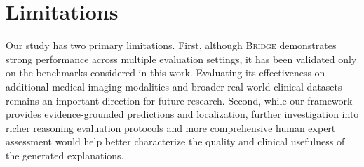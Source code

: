 \documentclass[10pt,twocolumn,letterpaper]{article}
\newcommand{\bridge}{\textsc{Bridge}}
\begin{document}
\section{Limitations}
Our study has two primary limitations. First, although \bridge{} demonstrates strong performance across multiple evaluation settings, it has been validated only on the benchmarks considered in this work. Evaluating its effectiveness on additional medical imaging modalities and broader real-world clinical datasets remains an important direction for future research. Second, while our framework provides evidence-grounded predictions and localization, further investigation into richer reasoning evaluation protocols and more comprehensive human expert assessment would help better characterize the quality and clinical usefulness of the generated explanations.

{
    \small
    
    
}
\end{document}
